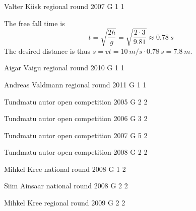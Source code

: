 \documentclass[11pt]{article}
\begin{document}
{Valter Kiisk} %
{regional round} %
{2007} %
{G 1} %
{1} %
{

\ifEngSolution
The free fall time is 
\[
t=\sqrt{\frac{2 h}{g}}=\sqrt{\frac{2 \cdot 3}{\num{9,81}}} \approx \SI{0,78}{s}
\]
The desired distance is thus $s = vt = \SI{10}{m/s} \cdot \SI{0,78}{s} = \SI{7,8}{m}$.
\fi
}

\ylDisplay{} %
{Aigar Vaigu} %
{regional round} %
{2010} %
{G 1} %
{1} %
{

\ifEngSolution
\fi
}

\ylDisplay{} %
{Andreas Valdmann} %
{regional round} %
{2011} %
{G 1} %
{1} %
{

\ifEngSolution
\fi
}

\ylDisplay{} %
{Tundmatu autor} %
{open competition} %
{2005} %
{G 2} %
{2} %
{

\ifEngSolution
\fi
}

\ylDisplay{} %
{Tundmatu autor} %
{open competition} %
{2006} %
{G 3} %
{2} %
{

\ifEngSolution
\fi
}

\ylDisplay{} %
{Tundmatu autor} %
{open competition} %
{2007} %
{G 5} %
{2} %
{

\ifEngSolution
\fi
}

\ylDisplay{} %
{Tundmatu autor} %
{open competition} %
{2008} %
{G 2} %
{2} %
{

\ifEngSolution
\fi
}

\ylDisplay{} %
{Mihkel Kree} %
{national round} %
{2008} %
{G 1} %
{2} %
{

\ifEngSolution
\fi
}

\ylDisplay{} %
{Siim Ainsaar} %
{national round} %
{2008} %
{G 2} %
{2} %
{

\ifEngSolution
\fi
}

\ylDisplay{} %
{Mihkel Kree} %
{regional round} %
{2009} %
{G 2} %
{2} %
{

\ifEngSolution
\fi
}
\end{document}
